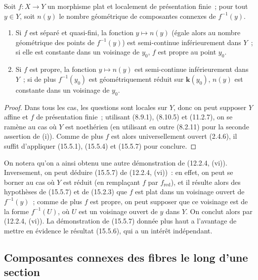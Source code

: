 \begin{proposition}[15.5.9]
\label{IV.15.5.9-fr}
Soit $f:X\to Y$ un morphisme plat et localement de présentation finie~; pour tout $y\in Y$, soit $n(y)$ le nombre géométrique de composantes connexes de $f^{-1}(y)$.
\begin{enumerate}[label=\emph{(\roman*)}]
  \item Si $f$ est séparé et quasi-fini, la fonction $y\mapsto n(y)$ (égale alors au nombre géométrique des points de $f^{-1}(y)$) est semi-continue inférieurement dans $Y$~; si elle est constante dans un voisinage de $y_0$, $f$ est propre au point $y_0$.
  \item Si $f$ est propre, la fonction $y\mapsto n(y)$ est semi-continue inférieurement dans $Y$~; si de plus $f^{-1}(y_0)$ est géométriquement réduit sur $\mathbf{k}(y_0)$, $n(y)$ est constante dans un voisinage de $y_0$.
\end{enumerate}
\end{proposition}

\begin{proof}
Dans tous les cas, les questions sont locales sur $Y$, donc on peut supposer $Y$ affine et $f$ de présentation finie~; utilisant (8.9.1), (8.10.5) et (11.2.7), on se ramène au cas où $Y$ est noethérien (en utilisant en outre (8.2.11) pour la seconde assertion de (i)). Comme de plus $f$ est alors universellement ouvert (2.4.6), il suffit d'appliquer (15.5.1), (15.5.4) et (15.5.7) pour conclure.
\end{proof}

\begin{remark}[15.5.10]
\label{IV.15.5.10-fr}
On notera qu'on a ainsi obtenu une autre démonstration de (12.2.4, (vi)). Inversement, on peut déduire (15.5.7) de (12.2.4, (vi))~: en effet, on peut se borner au cas où $Y$ est réduit (en remplaçant $f$ par $f_{\mathrm{red}}$), et il résulte alors des hypothèses de (15.5.7) et de (15.2.3) que $f$ est plat dans un voisinage ouvert de $f^{-1}(y)$~; comme de plus $f$ est propre, on peut supposer que ce voisinage est de la forme $f^{-1}(U)$, où $U$ est un voisinage ouvert de $y$ dans $Y$. On conclut alors par (12.2.4, (vi)). La démonstration de (15.5.7) donnée plus haut a l'avantage de mettre en évidence le résultat (15.5.6), qui a un intérêt indépendant.
\end{remark}


\subsection{Composantes connexes des fibres le long d'une section}
\label{subsection:IV.15.6-fr}

